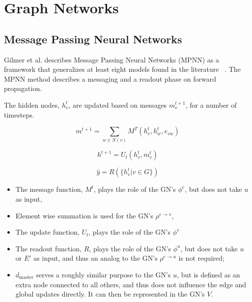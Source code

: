 \section{Graph Networks}

\subsection{Message Passing Neural Networks}

Gilmer et al. describes Message Passing Neural Networks (MPNN) as a framework that generalizes at least eight models found in the literature ~\cite{Gilmer_2017}. The MPNN method describes a messaging and a readout phase on forward propagation.
	
The hidden nodes, $h_v^t$, are updated based on messages $m_v^{t+1}$, for a number of timesteps.

\begin{equation}
    \label{eqn:message}
    m^{t+1} = \sum_{w \in N(v)} M ^ {T} (h^t_v, h^t_w, e_{vw})
\end{equation}

\begin{equation}
    h^{t+1} = U_t(h^t_v, m^t_v)
\end{equation}

\begin{equation}
    \hat{y} = R (\{h^t_v | v \in G\})
\end{equation}

\begin{itemize}

    \item The message function, $M^{t}$, plays the role of the GN’s $\phi ^ e$, but does not take $u$ as input,
    
    \item Element wise summation is used for the GN’s $\rho ^ {e \rightarrow v}$,
    
    \item The update function, $U_t$, plays the role of the GN’s $\phi ^ v$
    
    \item The readout function, $R$, plays the role of the GN’s $\phi ^ u$, but does not take $u$ or $E'$ as input, and thus an analog to the GN’s $\rho ^ {e \rightarrow u}$ is not required;
    
    \item $d_{\text{master}}$ serves a roughly similar purpose to the GN’s $u$, but is defined as an extra node connected to all others, and thus does not influence the edge and global updates directly. It can then be represented in the GN’s $V$.

\end{itemize}

